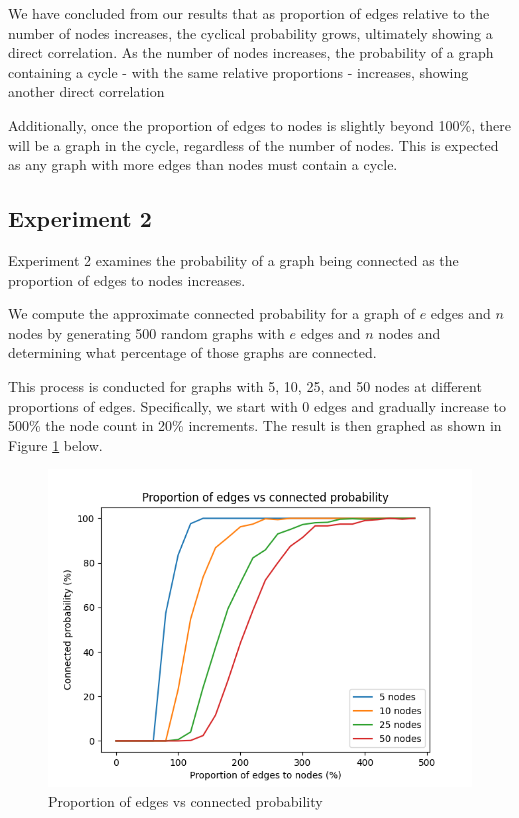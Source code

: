 \documentclass[titlepage]{article}
\begin{document}
We have concluded from our results that as proportion of edges relative to the number of nodes increases, the cyclical probability grows, ultimately showing a direct correlation. As the number of nodes increases, the probability of a graph containing a cycle - with the same relative proportions - increases, showing another direct correlation

Additionally, once the proportion of edges to nodes is slightly beyond 100\%, there will be a graph in the cycle, regardless of the number of nodes. This is expected as any graph with more edges than nodes must contain a cycle.

\subsection{Experiment 2}

Experiment 2 examines the probability of a graph being connected as the proportion of edges to nodes increases.

We compute the approximate connected probability for a graph of $e$ edges and $n$ nodes by generating 500 random graphs with $e$ edges and $n$ nodes and determining what percentage of those graphs are connected.

This process is conducted for graphs with 5, 10, 25, and 50 nodes at different proportions of edges. Specifically, we start with 0 edges and gradually increase to 500\% the node count in 20\% increments. The result is then graphed as shown in Figure \ref{fig:edges_vs_connected} below.

\begin{figure}[H]
    \centering
    \includegraphics[width=0.8\linewidth]{experiment_2.png}
    \caption{Proportion of edges vs connected probability}
    \label{fig:edges_vs_connected}
\end{figure}
\end{document}
